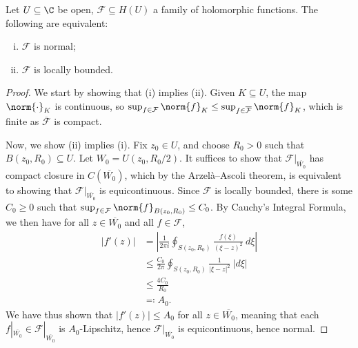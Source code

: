 \documentclass[10pt]{mypackage}
\begin{document}
\begin{theorem}
  Let $U\subseteq \C$ be open, $\mathcal{F}\subseteq H(U)$ a family of holomorphic functions. The following are equivalent:
  \begin{enumerate}[(i)]
    \item $\mathcal{F}$ is normal;
    \item $\mathcal{F}$ is locally bounded.
  \end{enumerate}
\end{theorem}
\begin{proof}
  We start by showing that (i) implies (ii). Given $K\subseteq U$, the map $\norm{\cdot}_{K}$ is continuous, so $\sup_{f\in \mathcal{F}}\norm{f}_{K}\leq \sup_{f\in \overline{\mathcal{F}}}\norm{f}_{K}$, which is finite as $ \overline{\mathcal{F}} $ is compact.%

  Now, we show (ii) implies (i). Fix $z_0\in U$, and choose $R_0 > 0$ such that $B\left( z_0,R_0 \right)\subseteq U$. Let $W_0 = U\left( z_0,R_0/2 \right)$. It suffices to show that $\mathcal{F}|_{ \overline{W_0} }$ has compact closure in $C\left( \overline{W_0} \right)$, which by the Arzelà--Ascoli theorem, is equivalent to showing that $\mathcal{F}|_{ \overline{W_0} }$ is equicontinuous. Since $ \mathcal{F} $ is locally bounded, there is some $C_0 \geq 0$ such that $\sup_{f\in \mathcal{F}}\norm{f}_{ B\left( z_0,R_0 \right) }\leq C_0$. By Cauchy's Integral Formula, we then have for all $z\in \overline{W_0}$ and all $f\in \mathcal{F}$,
  \begin{align*}
    \left\vert f'\left( z \right) \right\vert &= \left\vert \frac{1}{2\pi i} \oint_{S\left( z_0,R_0 \right)}^{} \frac{f\left( \xi \right)}{\left( \xi-z \right)^2}\:d\xi \right\vert\\
                                              &\leq \frac{C_0}{2\pi} \oint_{S\left( z_0,R_0 \right)}^{} \frac{1}{\left\vert \xi-z \right\vert^2}\:\left\vert d\xi \right\vert\\
                                              &\leq \frac{4C_0}{R_0}\\
                                              &\eqcolon A_0.
  \end{align*}
  We have thus shown that $\left\vert f'\left( z \right) \right\vert\leq A_0$ for all $z\in \overline{W_0}$, meaning that each $f|_{ \overline{W_0} }\in \mathcal{F}|_{ \overline{W_0} }$ is $A_0$-Lipschitz, hence $\mathcal{F}|_{ \overline{W_0} }$ is equicontinuous, hence normal.
\end{proof}
\end{document}
